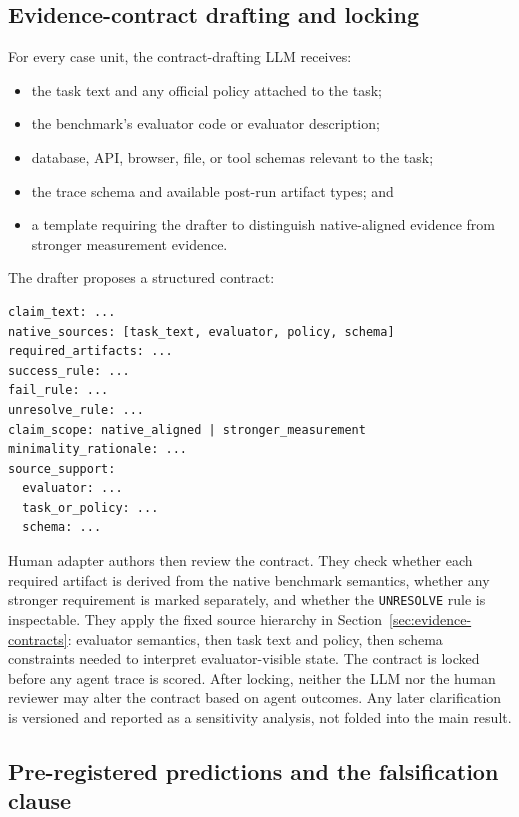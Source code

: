 \documentclass{article}
\begin{document}
\subsection{Evidence-contract drafting and locking}
\label{sec:contract-drafting}

For every case unit, the contract-drafting LLM receives:
\begin{itemize}\itemsep0.1em
\item the task text and any official policy attached to the task;
\item the benchmark's evaluator code or evaluator description;
\item database, API, browser, file, or tool schemas relevant to the task;
\item the trace schema and available post-run artifact types; and
\item a template requiring the drafter to distinguish native-aligned evidence
from stronger measurement evidence.
\end{itemize}

The drafter proposes a structured contract:
\begin{lstlisting}
claim_text: ...
native_sources: [task_text, evaluator, policy, schema]
required_artifacts: ...
success_rule: ...
fail_rule: ...
unresolve_rule: ...
claim_scope: native_aligned | stronger_measurement
minimality_rationale: ...
source_support:
  evaluator: ...
  task_or_policy: ...
  schema: ...
\end{lstlisting}

Human adapter authors then review the contract. They check whether each
required artifact is derived from the native benchmark semantics, whether any
stronger requirement is marked separately, and whether the \texttt{UNRESOLVE}
rule is inspectable. They apply the fixed source hierarchy in
Section~\ref{sec:evidence-contracts}: evaluator semantics, then task text and
policy, then schema constraints needed to interpret evaluator-visible state. The
contract is locked before any agent trace is scored. After locking, neither the
LLM nor the human reviewer may alter the contract based on agent outcomes. Any
later clarification is versioned and reported as a sensitivity analysis, not
folded into the main result.

\subsection{Pre-registered predictions and the falsification clause}
\label{sec:predictions}
\end{document}
